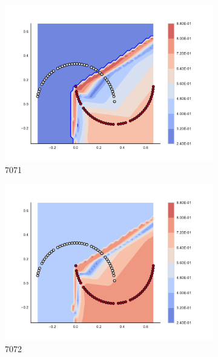 \begin{figure}[h]
\begin{subfigure}[b]{0.09\textwidth}
    \includegraphics[clip, trim=2.35cm 1.75cm 4.5cm 0cm,width=\textwidth]{img/convergence/7071.pdf}
    \caption{7071}
    \label{fig:convergence_7071}
\end{subfigure}
%
\begin{subfigure}[b]{0.09\textwidth}
    \includegraphics[clip, trim=2.35cm 1.75cm 4.5cm 0cm,width=\textwidth]{img/convergence/7072.pdf}
    \caption{7072}
    \label{fig:convergence_7072}
\end{subfigure}
%
\begin{subfigure}[b]{0.09\textwidth}

\end{subfigure}
\end{figure}
